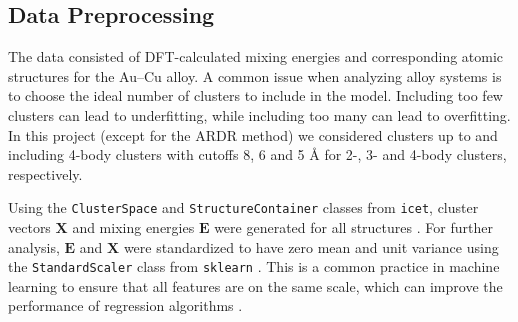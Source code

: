\documentclass[a4paper, 12pt]{article}
\begin{document}
\subsection{Data Preprocessing}
The data consisted of DFT-calculated mixing energies and corresponding atomic structures for the Au--Cu alloy. A common issue when analyzing alloy systems is to choose the ideal number of clusters to include in the model. Including too few clusters can lead to underfitting, %
while including too many can lead to overfitting. %
In this project (except for the ARDR method) we considered clusters up to and including 4-body clusters with cutoffs 8, 6 and 5 Å for 2-, 3- and 4-body clusters, respectively.

Using the \texttt{ClusterSpace} and \texttt{StructureContainer} classes from \texttt{icet}, cluster vectors $\bm{X}$ and mixing energies $\bm{E}$ were generated for all structures \cite{angqvist2019icet}. %
For further analysis, $\bm{E}$ and $\bm{X}$ were standardized to have zero mean and unit variance using the \texttt{StandardScaler} class from \texttt{sklearn} \cite{scikit-learn}. This is a common practice in machine learning to ensure that all features are on the same scale, which can improve the performance of regression algorithms \cite{scikit-learn}. %
\end{document}

